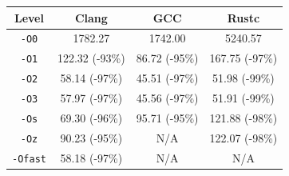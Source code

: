 \begin{tabular*}{\columnwidth}{@{\extracolsep\fill}cccc@{\extracolsep\fill}}
\toprule
\textbf{Level} & \textbf{Clang} & \textbf{GCC} & \textbf{Rustc} \\
\midrule
\texttt{-O0} & 1782.27 & 1742.00 & 5240.57 \\
\texttt{-O1} & 122.32 (-93\%) & 86.72 (-95\%) & 167.75 (-97\%) \\
\texttt{-O2} & 58.14 (-97\%) & 45.51 (-97\%) & 51.98 (-99\%) \\
\texttt{-O3} & 57.97 (-97\%) & 45.56 (-97\%) & 51.91 (-99\%) \\
\texttt{-Os} & 69.30 (-96\%) & 95.71 (-95\%) & 121.88 (-98\%) \\
\texttt{-Oz} & 90.23 (-95\%) & N/A & 122.07 (-98\%) \\
\texttt{-Ofast} & 58.18 (-97\%) & N/A & N/A \\
\bottomrule
\end{tabular*}
